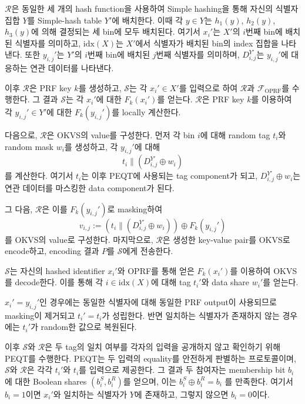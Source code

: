 \documentclass[sigconf,anonymous,review]{acmart}
\begin{document}
$\mathcal{R}$은 동일한 세 개의 hash function을
사용하여 Simple hashing을 통해 자신의 식별자 집합 $Y$를
Simple-hash table $Y'$에 배치한다. 이때 각 $y\in Y$는
$h_1(y)$, $h_2(y)$, $h_3(y)$에 의해 결정되는 세 bin에 모두
배치된다. 여기서 $x_i'$는 $X'$의 $i$번째 bin에 배치된 식별자를
의미하고, $\mathrm{idx}(X)$는 $X'$에서 식별자가 배치된 bin의
index 집합을 나타낸다. 또한 $y_{i,j}'$는 $Y'$의 $i$번째 bin에
배치된 $j$번째 식별자를 의미하며, $D_{i,j}^{Y'}$는
$y_{i,j}'$에 대응하는 연관 데이터를 나타낸다.

이후 $\mathcal{R}$은 PRF key $k$를 생성하고,
$\mathcal{S}$는 각 $x_i' \in X'$를 입력으로 하여
$\mathcal{R}$과 $\mathcal{F}_{\mathrm{OPRF}}$를 수행한다.
그 결과 $\mathcal{S}$는 각 $x_i'$에 대한 $F_k(x_i')$를 얻는다. $\mathcal{R}$은 PRF key $k$를 이용하여
각 $y_{i,j}' \in Y'$에 대한 $F_k(y_{i,j}')$를 locally 계산한다.

다음으로, $\mathcal{R}$은 OKVS의 value를 구성한다. 먼저 각 bin $i$에 대해 random tag $t_i$와
random mask $w_i$를 생성하고, 각 $y_{i,j}'$에 대해
\[
    t_i \parallel \left(D_{i,j}^{Y'} \oplus w_i\right)
\]
를 계산한다.
여기서 $t_i$는 이후 PEQT에 사용되는 tag component가 되고,
$D_{i,j}^{Y'} \oplus w_i$는 연관 데이터를 마스킹한 data component가 된다.

그 다음, $\mathcal{R}$은 이를 $F_k(y_{i,j}')$로 masking하여
\[
    v_{i,j}
    :=
    \left(
        t_i \parallel \left(D_{i,j}^{Y'} \oplus w_i\right)
    \right)
    \oplus F_k(y_{i,j}')
\]
를 OKVS의 value로 구성한다.
마지막으로, $\mathcal{R}$은 생성한 key-value pair를 OKVS로 encode하고,
encoding 결과 $P$를 $\mathcal{S}$에게 전송한다.

$\mathcal{S}$는 자신의 hashed identifier $x_i'$와 OPRF를 통해 얻은
$F_k(x_i')$를 이용하여 OKVS를 decode한다. 이를 통해 각
$i\in\mathrm{idx}(X)$에 대해 tag $t_i'$와 data share $w_i'$를
얻는다. 

$x_i'=y_{i,j}'$인 경우에는 동일한 식별자에 대해 동일한 PRF output이
사용되므로 masking이 제거되고 $t_i'=t_i$가 성립한다.
반면 일치하는 식별자가 존재하지 않는 경우에는 $t_i'$가 random한
값으로 복원된다.

이후 $\mathcal{S}$와 $\mathcal{R}$은 두 tag의 일치 여부를
각자의 입력을 공개하지 않고 확인하기 위해 PEQT를 수행한다.
PEQT는 두 입력의 equality를 안전하게 판별하는 프로토콜이며,
$\mathcal{S}$와 $\mathcal{R}$은 각각 $t_i'$와 $t_i$를 입력으로 제공한다.
그 결과 두 참여자는 membership bit $b_i$에 대한 Boolean shares
$(b_i^S,b_i^R)$를 얻으며, 이는 $b_i^S \oplus b_i^R = b_i$
를 만족한다. 여기서 $b_i=1$이면 $x_i'$와 일치하는 식별자가
$Y$에 존재하고, 그렇지 않으면 $b_i=0$이다.
\end{document}

